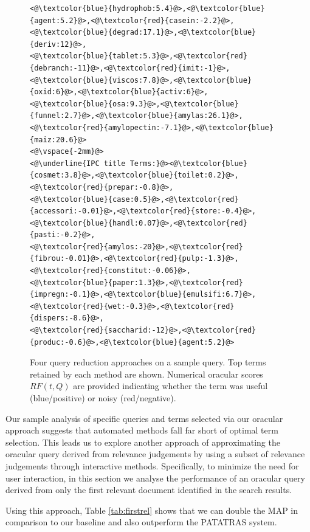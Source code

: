 \begin{figure}[t!]
\begin{framed}
\begin{lstlisting}[basicstyle=\scriptsize\ttfamily , linewidth=\columnwidth,breaklines=true]
<@\textcolor{blue}{hydrophob:5.4}@>,<@\textcolor{blue}{agent:5.2}@>,<@\textcolor{red}{casein:-2.2}@>,<@\textcolor{blue}{degrad:17.1}@>,<@\textcolor{blue}{deriv:12}@>,
<@\textcolor{blue}{tablet:5.3}@>,<@\textcolor{red}{debranch:-11}@>,<@\textcolor{red}{imit:-1}@>,<@\textcolor{blue}{viscos:7.8}@>,<@\textcolor{blue}{oxid:6}@>,<@\textcolor{blue}{activ:6}@>,
<@\textcolor{blue}{osa:9.3}@>,<@\textcolor{blue}{funnel:2.7}@>,<@\textcolor{blue}{amylas:26.1}@>,<@\textcolor{red}{amylopectin:-7.1}@>,<@\textcolor{blue}{maiz:20.6}@>
<@\vspace{-2mm}@>
<@\underline{IPC title Terms:}@><@\textcolor{blue}{cosmet:3.8}@>,<@\textcolor{blue}{toilet:0.2}@>,<@\textcolor{red}{prepar:-0.8}@>,
<@\textcolor{blue}{case:0.5}@>,<@\textcolor{red}{accessori:-0.01}@>,<@\textcolor{red}{store:-0.4}@>,<@\textcolor{blue}{handl:0.07}@>,<@\textcolor{red}{pasti:-0.2}@>,
<@\textcolor{red}{amylos:-20}@>,<@\textcolor{red}{fibrou:-0.01}@>,<@\textcolor{red}{pulp:-1.3}@>,<@\textcolor{red}{constitut:-0.06}@>,
<@\textcolor{blue}{paper:1.3}@>,<@\textcolor{red}{impregn:-0.1}@>,<@\textcolor{blue}{emulsifi:6.7}@>,<@\textcolor{red}{wet:-0.3}@>,<@\textcolor{red}{dispers:-8.6}@>,
<@\textcolor{red}{saccharid:-12}@>,<@\textcolor{red}{produc:-0.6}@>,<@\textcolor{blue}{agent:5.2}@>
 \end{lstlisting} 
 \vspace*{-4ex}
\end{framed}
 \vspace*{-2ex}
  \caption{Four query reduction approaches on a sample query.  Top
    terms retained by each method are shown.  Numerical oracular
    scores $\mathit{RF}(t,Q)$ are provided indicating whether the term
    was useful (blue/positive) or noisy (red/negative).}
  \label{fig:anecdotal}  
\end{figure}

Our sample analysis of specific queries and terms selected via our oracular
approach suggests that automated methods fall far short of optimal term selection.
This leads us to explore another approach of approximating the oracular query
derived from relevance judgements by using a subset of relevance judgements
through interactive methods.  Specifically, to minimize the need for user interaction,
in this section we analyse the performance of an oracular query derived from
only the first relevant document identified in the search results.

Using this approach, Table \ref{tab:firstrel} shows that we can double the MAP in comparison to our baseline and also outperform the PATATRAS system.

